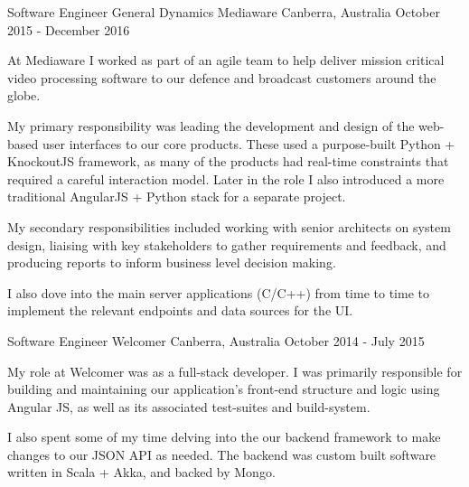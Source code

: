 \begin{cventries}

\cventry
{Software Engineer} %
{General Dynamics Mediaware} %
{Canberra, Australia} %
{October 2015 - December 2016} %
{ %
\begin{cvitems}
  \item {At Mediaware I worked as part of an agile team to help deliver mission critical video processing software to our defence and broadcast customers around the globe.}
  \item {My primary responsibility was leading the development and design of the web-based user interfaces to our core products. These used a purpose-built Python + KnockoutJS }framework, as many of the products had real-time constraints that required a careful interaction model. Later in the role I also introduced a more traditional AngularJS + Python stack for a separate project.
  \item {My secondary responsibilities included working with senior architects on system design, liaising with key stakeholders to gather requirements and feedback, and producing }reports to inform business level decision making.
  \item {I also dove into the main server applications (C/C++) from time to time to implement the relevant endpoints and data sources for the UI.}
\end{cvitems}
\vspace{2.0mm}
}


\cventry
{Software Engineer} %
{Welcomer} %
{Canberra, Australia} %
{October 2014 - July 2015} %
{ %
\begin{cvitems}
  \item {My role at Welcomer was as a full-stack developer. I was primarily responsible for building and maintaining our application's front-end structure and logic using Angular JS, as well as its associated test-suites and build-system.}
  \item {I also spent some of my time delving into the our backend framework to make changes to our JSON API as needed. The backend was custom built software written in Scala + Akka, and backed by Mongo.}
\end{cvitems}
\vspace{2.0mm}
}


\end{cventries}

